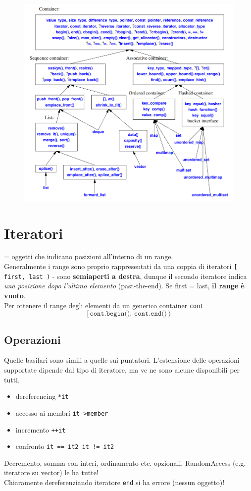 \documentclass[10pt, oneside]{book}
\begin{document}
\begin{figure}[h!]
\centering
\includegraphics[scale=0.7]{containers.png}
\end{figure}

\section{Iteratori}
= oggetti che indicano posizioni all'interno di un range.\\
Generalmente i range sono proprio rappresentati da una coppia di iteratori \texttt{\big[ first, last \big)} - sono \textbf{semiaperti a destra}, dunque il secondo iteratore indica \textit{una posizione dopo l'ultimo elemento} (past-the-end). Se first = last, \textbf{il range è vuoto}.\\
Per ottenere il range degli elementi da un generico container \texttt{cont} 
\[\big[ \, \texttt{cont.begin(), cont.end()} \, \big)\]

\subsection{Operazioni}
Quelle basilari sono simili a quelle sui puntatori. L'estensione delle operazioni supportate dipende dal tipo di iteratore, ma ve ne sono alcune disponibili per tutti.
\begin{itemize}
\item dereferencing \texttt{*it}
\item accesso ai membri \texttt{it->member}
\item incremento \texttt{++it}
\item confronto \texttt{it == it2   \texttt{it != it2}}
\end{itemize}
Decremento, somma con interi, ordinamento etc. opzionali. RandomAccess (e.g. iteratore su vector) le ha tutte!\\
Chiaramente dereferenziando iteratore \texttt{end} si ha errore (nessun oggetto)!
\end{document}
